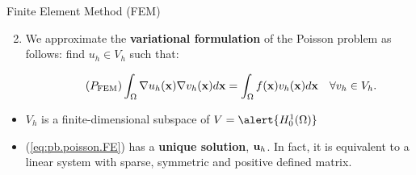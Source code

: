 \begin{frame}{Finite Element Method (FEM) \quad {}}
  \begin{enumerate}
    \setcounter{enumi}{1}
  \item We \alert{approximate the \textbf{variational
        formulation}} of the Poisson problem as follows: \alert{find
    $u_h\in V_h$} such that:
    \begin{BlockNoTitle}
      \begin{equation}
        \tag{\ensuremath{P_{\text{FEM}}}}
        \int_\Omega \grad u_h(\xx) \grad v_h(\xx) d\xx = \int_\Omega f(\xx) v_h(\xx) d\xx \quad \forall v_h\in V_h.
        \label{eq:pb.poisson.FE}
      \end{equation}
    \end{BlockNoTitle}
  \end{enumerate}

 \bigskip

  \begin{proposition}
    \begin{itemize}
    \setlength\itemsep{0.7em}
    \item \alert{$V_h$} is a \alert{finite-dimensional} subspace of
        $V=\alert{H_0^1(\Omega)}$
    \item (\ref{eq:pb.poisson.FE}) has a \alert{\textbf{unique
          solution}}, $\mathbf{u}_{h}$. In fact, it is \alert{equivalent to a
        linear system} with sparse, symmetric and positive defined
      matrix.
    \end{itemize}
  \end{proposition}
\end{frame}


